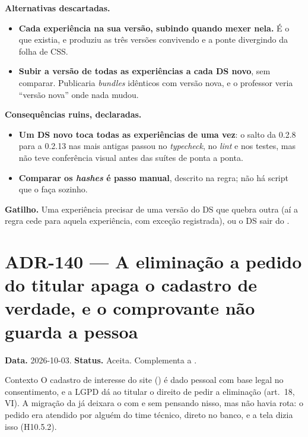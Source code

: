 \textbf{Alternativas descartadas.}

\begin{itemize}
  \item \textbf{Cada experiência na sua versão, subindo quando mexer nela.} É
    o que existia, e produziu as três versões convivendo e a ponte divergindo
    da folha de CSS.
  \item \textbf{Subir a versão de todas as experiências a cada DS novo}, sem
    comparar. Publicaria \emph{bundles} idênticos com versão nova, e o
    professor veria ``versão nova'' onde nada mudou.
\end{itemize}

\textbf{Consequências ruins, declaradas.}

\begin{itemize}
  \item \textbf{Um DS novo toca todas as experiências de uma vez}: o salto da
    0.2.8 para a 0.2.13 nas mais antigas passou no \emph{typecheck}, no
    \emph{lint} e nos testes, mas não teve conferência visual antes das suítes
    de ponta a ponta.
  \item \textbf{Comparar os \emph{hashes} é passo manual}, descrito na regra;
    não há script que o faça sozinho.
\end{itemize}

\textbf{Gatilho.} Uma experiência precisar de uma versão do DS que quebra outra
(aí a regra cede para aquela experiência, com exceção registrada), ou o DS
sair do .

\section{ADR-140 --- A eliminação a pedido do titular apaga o cadastro de verdade, e o comprovante não guarda a pessoa}
\label{adr:prospeccao-eliminacao}

\textbf{Data.} 2026-10-03. \textbf{Status.} Aceita. Complementa a
.

\begin{especificacao}{Contexto}
O cadastro de interesse do site () é dado pessoal com
base legal no consentimento, e a LGPD dá ao titular o direito de pedir a
eliminação (art.~18, VI). A migração da  já deixara o 
com  e sem  pensando nisso, mas não havia rota: o pedido
era atendido por alguém do time técnico, direto no banco, e a tela dizia isso
(H10.5.2).
\end{especificacao}

